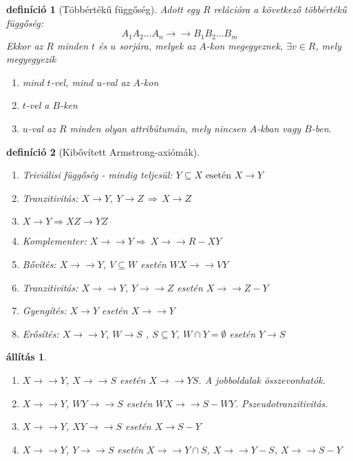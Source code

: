 \documentclass[fleqn,10pt,a4paper]{article}
\newcommand{\nn}{\Rightarrow}
\newcommand{\listazjromai}{
  \renewcommand{\theenumi}{\roman{enumi}}
  \renewcommand{\labelenumi}{(\theenumi)}
}
\newenvironment{enumzjromai}{\listazjromai\begin{enumerate}}{\end{enumerate}}
\newenvironment{enumzjr}{\begin{enumzjromai}}{\end{enumzjromai}}
\newenvironment{enumAr}{\renewcommand{\labelenumi}{\emph{{\small (\emph{AR\theenumi})}}}\begin{enumerate}}{\end{enumerate}}
\theoremstyle{magyar}
\newtheorem{de}{definíció}[section]
\newtheorem{al}{állítás}[section]
\begin{document}
  \begin{de}[Többértékű függőség] Adott egy $R$ relációra a következő többértékű függőség:
    \[A_1 A_2\ldots A_n \to \to B_1 B_2 \ldots B_m\]
    Ekkor az  $R$ minden $t$ és $u$ sorjára, melyek az $A$-kon megegyeznek, $\exists v\in R$, mely megyegyezik
    \begin{enumerate}
    \item mind $t$-vel, mind $u$-val az $A$-kon
    \item $t$-vel a $B$-ken
    \item $u$-val az $R$ minden olyan attribútumán, mely nincsen $A$-kban vagy $B$-ben.
    \end{enumerate}
  \end{de}

  \begin{de}[Kibővített Armstrong-axiómák]\ \\
    \begin{enumAr}
    \item Triviálisi függőség - mindig teljesül: $Y \subseteq X \text{ esetén } X\to Y$
    \item Tranzitivitás: $X \to Y,\  Y\to Z\, \nn\, X \to Z$
    \item $X\to Y \nn XZ \to YZ$
    \item Komplementer: $X\to\to Y \nn \ X\to\to R-XY$
    \item Bővítés: $X\to\to Y$, $V\subseteq W$ esetén $WX\to\to VY$
    \item Tranzitivitás: $X\to\to Y$, $Y\to\to Z$ esetén $X\to\to Z-Y$
    \item Gyengítés: $X\to Y$ esetén $X\to\to Y$
    \item Erősítés: $X\to\to Y$, $W\to S$ , $S\subseteq Y$, $W\cap Y = \emptyset$ esetén $Y\to S$
    \end{enumAr}
  \end{de}

  \begin{al} \
    \begin{enumzjr}
    \item $X\to\to Y$, $X\to\to S$ esetén $X\to\to YS$. A jobboldalak összevonhatók.
    \item $X\to\to Y$, $WY\to\to S$ esetén $WX\to\to S-WY$. Pszeudotranzitivitás.
    \item $X\to\to Y$, $XY\to\to S$ esetén $X\to S- Y$
    \item $X\to\to Y$, $Y\to\to S$ esetén $X\to\to Y\cap S$, $X\to\to Y- S$, $X\to\to S-Y$
    \end{enumzjr}
  \end{al}
\end{document}
